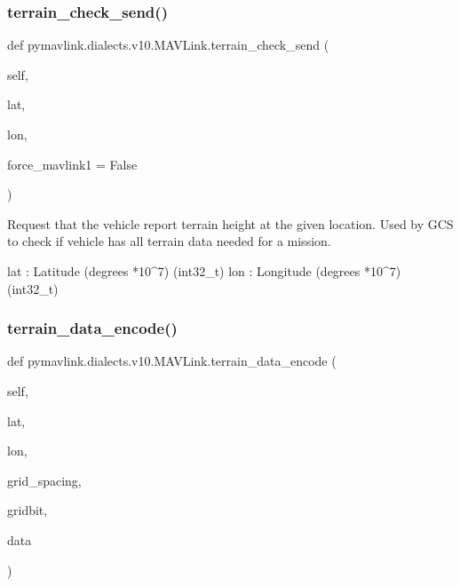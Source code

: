 \begin{DoxyVerb}
\begin{DoxyVerb}
\begin{DoxyVerb}
\begin{DoxyVerb}
\begin{DoxyVerb}
\begin{DoxyVerb}
\begin{DoxyVerb}
\begin{DoxyVerb}
\begin{DoxyVerb}
\begin{DoxyVerb}
\subsubsection{\texorpdfstring{terrain\+\_\+check\+\_\+send()}{terrain\_check\_send()}}
{\footnotesize\ttfamily def pymavlink.\+dialects.\+v10.\+M\+A\+V\+Link.\+terrain\+\_\+check\+\_\+send (\begin{DoxyParamCaption}\item[{}]{self,  }\item[{}]{lat,  }\item[{}]{lon,  }\item[{}]{force\+\_\+mavlink1 = {\ttfamily False} }\end{DoxyParamCaption})}

\begin{DoxyVerb}Request that the vehicle report terrain height at the given location.
Used by GCS to check if vehicle has all terrain data
needed for a mission.

lat                       : Latitude (degrees *10^7) (int32_t)
lon                       : Longitude (degrees *10^7) (int32_t)\end{DoxyVerb}
 \mbox{\label{classpymavlink_1_1dialects_1_1v10_1_1MAVLink_abd4f1275b4bf234fe75cc1ae40e63e6a}} 
\subsubsection{\texorpdfstring{terrain\+\_\+data\+\_\+encode()}{terrain\_data\_encode()}}
{\footnotesize\ttfamily def pymavlink.\+dialects.\+v10.\+M\+A\+V\+Link.\+terrain\+\_\+data\+\_\+encode (\begin{DoxyParamCaption}\item[{}]{self,  }\item[{}]{lat,  }\item[{}]{lon,  }\item[{}]{grid\+\_\+spacing,  }\item[{}]{gridbit,  }\item[{}]{data }\end{DoxyParamCaption})}


\end{DoxyVerb}
\end{DoxyVerb}
\end{DoxyVerb}
\end{DoxyVerb}
\end{DoxyVerb}
\end{DoxyVerb}
\end{DoxyVerb}
\end{DoxyVerb}
\end{DoxyVerb}
\end{DoxyVerb}
